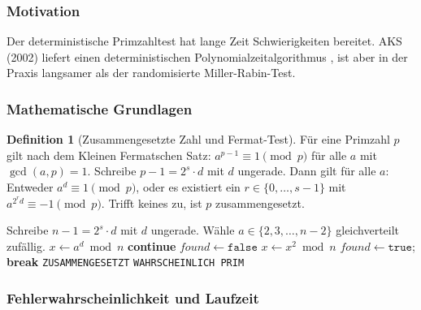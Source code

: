 ﻿\documentclass[12pt,a4paper]{article}
\theoremstyle{definition}
\newtheorem{definition}{Definition}[section]
\theoremstyle{plain}
\theoremstyle{remark}
\begin{document}
\subsubsection{Motivation}

Der deterministische Primzahltest hat lange Zeit Schwierigkeiten bereitet.
AKS (2002) liefert einen deterministischen Polynomialzeitalgorithmus
\cite{agrawal2004primes}, ist aber in der Praxis langsamer als der
randomisierte Miller-Rabin-Test.

\subsubsection{Mathematische Grundlagen}

\begin{definition}[Zusammengesetzte Zahl und Fermat-Test]\label{def:fermat}
  Für eine Primzahl $p$ gilt nach dem Kleinen Fermatschen Satz:
  $a^{p-1} \equiv 1 \pmod{p}$ für alle $a$ mit $\gcd(a,p)=1$.
  Schreibe $p - 1 = 2^s \cdot d$ mit $d$ ungerade. Dann gilt für alle $a$:
  Entweder $a^d \equiv 1 \pmod{p}$, oder es existiert ein $r \in \{0,\ldots,s-1\}$
  mit $a^{2^r d} \equiv -1 \pmod{p}$.
  Trifft keines zu, ist $p$ zusammengesetzt.
\end{definition}

\begin{algorithm}[H]
  \caption{Miller-Rabin-Primzahltest}
  \label{alg:miller}
  \begin{algorithmic}[1]
    \State Schreibe $n - 1 = 2^s \cdot d$ mit $d$ ungerade.
      \State Wähle $a \in \{2, 3, \ldots, n-2\}$ gleichverteilt zufällig.
      \State $x \gets a^d \bmod n$ 
        \State \textbf{continue}
      \EndIf
      \State $\mathit{found} \gets \texttt{false}$
        \State $x \gets x^2 \bmod n$
          \State $\mathit{found} \gets \texttt{true}$; \textbf{break}
        \EndIf
      \EndFor
        \State \Return \texttt{ZUSAMMENGESETZT}
      \EndIf
    \EndFor
    \State \Return \texttt{WAHRSCHEINLICH PRIM}
  \end{algorithmic}
\end{algorithm}

\subsubsection{Fehlerwahrscheinlichkeit und Laufzeit}
\end{document}

